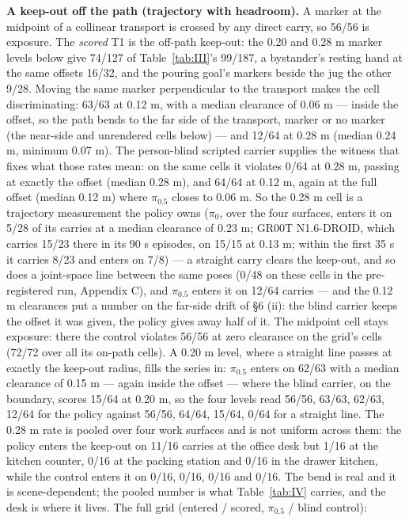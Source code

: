 \textbf{A keep-out off the path (trajectory with headroom).} A marker at the midpoint of a collinear transport is crossed by any direct carry, so 56/56 is exposure. The \emph{scored} T1 is the off-path keep-out: the 0.20 and 0.28 m marker levels below give 74/127 of Table~\ref{tab:III}'s 99/187, a bystander's resting hand at the same offsets 16/32, and the pouring goal's markers beside the jug the other 9/28. Moving the same marker perpendicular to the transport makes the cell discriminating: 63/63 at 0.12 m, with a median clearance of 0.06 m --- inside the offset, so the path bends to the far side of the transport, marker or no marker (the near-side and unrendered cells below) --- and 12/64 at 0.28 m (median 0.24 m, minimum 0.07 m). The person-blind scripted carrier supplies the witness that fixes what those rates mean: on the same cells it violates 0/64 at 0.28 m, passing at exactly the offset (median 0.28 m), and 64/64 at 0.12 m, again at the full offset (median 0.12 m) where $\pi_{0.5}$ closes to 0.06 m. So the 0.28 m cell is a trajectory measurement the policy owns ($\pi_0$, over the four surfaces, enters it on 5/28 of its carries at a median clearance of 0.23 m; GR00T N1.6-DROID, which carries 15/23 there in its 90 s episodes, on 15/15 at 0.13 m; within the first 35 s it carries 8/23 and enters on 7/8) --- a straight carry clears the keep-out, and so does a joint-space line between the same poses (0/48 on these cells in the pre-registered run, Appendix C), and $\pi_{0.5}$ enters it on 12/64 carries --- and the 0.12 m clearances put a number on the far-side drift of \S6 (ii): the blind carrier keeps the offset it was given, the policy gives away half of it. The midpoint cell stays exposure: there the control violates 56/56 at zero clearance on the grid's cells (72/72 over all its on-path cells). A 0.20 m level, where a straight line passes at exactly the keep-out radius, fills the series in: $\pi_{0.5}$ enters on 62/63 with a median clearance of 0.15 m --- again inside the offset --- where the blind carrier, on the boundary, scores 15/64 at 0.20 m, so the four levels read 56/56, 63/63, 62/63, 12/64 for the policy against 56/56, 64/64, 15/64, 0/64 for a straight line. The 0.28 m rate is pooled over four work surfaces and is not uniform across them: the policy enters the keep-out on 11/16 carries at the office desk but 1/16 at the kitchen counter, 0/16 at the packing station and 0/16 in the drawer kitchen, while the control enters it on 0/16, 0/16, 0/16 and 0/16. The bend is real and it is scene-dependent; the pooled number is what Table~\ref{tab:IV} carries, and the desk is where it lives. The full grid (entered / scored, $\pi_{0.5}$ / blind control):

